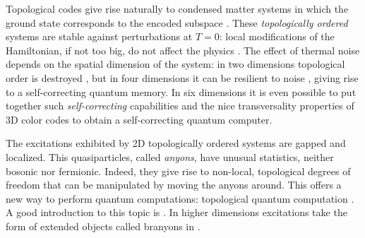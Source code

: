 \documentclass{article}
\begin{document}
Topological codes give rise naturally to condensed matter systems in which the ground state corresponds to the encoded subspace \cite{kitaev:2003:2}. These \emph{topologically ordered }systems are stable against perturbations at $T=0$: local modifications of the Hamiltonian, if not too big, do not affect the physics \cite{bravyi:2010:10010344}. The effect of thermal noise depends on the spatial dimension of the system: in two dimensions topological order is destroyed \cite{alicki:2009: 065303}, but in four dimensions it can be resilient to noise \cite{alicki:2008:08110033}, giving rise to a self-correcting quantum memory. In six dimensions it is even possible to put together such \emph{self-correcting} capabilities and the nice transversality properties of 3D color codes \cite{bombin:2009:09075228} to obtain a self-correcting quantum computer.

The excitations exhibited by 2D topologically ordered systems are gapped and localized. This quasiparticles, called \emph{anyons}, have unusual statistics, neither bosonic nor fermionic. Indeed, they give rise to non-local, topological degrees of freedom that can be manipulated by moving the anyons around. This offers a new way to perform quantum computations: topological quantum computation \cite{kitaev:2003:2,freedman:2003:31}. A good introduction to this topic is \cite{Preskill:2004:caltech}. In higher dimensions excitations take the form of extended objects called branyons in \cite{bombin:2007:75103}.

{}

\end{document}
